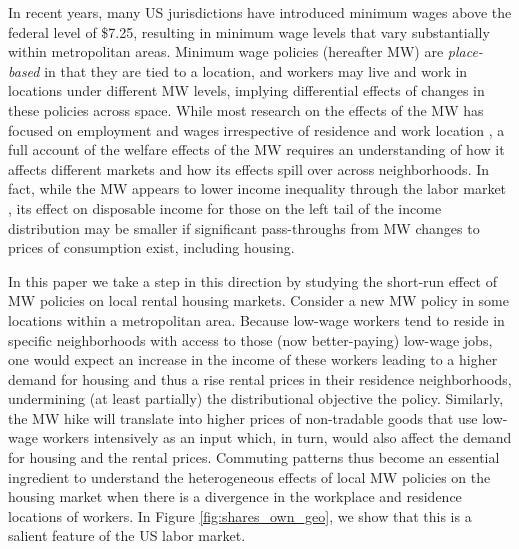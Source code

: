 

In recent years, many US jurisdictions have introduced minimum wages above the 
federal level of \$7.25, resulting in minimum wage levels that vary 
substantially within metropolitan areas.
Minimum wage policies (hereafter MW) are \textit{place-based} in that they are 
tied to a location, and workers may live and work in locations under different 
MW levels, 
implying differential effects of changes in these policies across space.
While most research on the effects of the MW has focused on employment and 
wages irrespective of residence and work location
\parencite[e.g.,][]{CardKrueger1994, CegnizEtAl2019},
a full account of the welfare effects of the MW requires an understanding of 
how it affects different markets and how its effects spill over across 
neighborhoods.
In fact, while the MW appears to lower income inequality through the labor 
market \parencite{Lee1999, AutorEtAl2016},
its effect on disposable income for those on the left tail of the income 
distribution may be smaller if significant pass-throughs from MW changes to 
prices of consumption exist, including housing.

In this paper we take a step in this direction by studying the short-run effect 
of MW policies on local rental housing markets.
Consider a new MW policy in some locations within a metropolitan area.
Because low-wage workers tend to reside in specific neighborhoods with access 
to those (now better-paying) low-wage jobs,
one would expect an increase in the income of these workers leading to a higher 
demand for housing and thus a rise rental prices in their residence 
neighborhoods,
undermining (at least partially) the distributional objective the policy.
Similarly, the MW hike will translate into higher prices of non-tradable goods 
that use low-wage workers intensively as an input which, in turn, 
would also affect the demand for housing and the rental prices.
Commuting patterns thus become an essential ingredient to understand the 
heterogeneous effects of local MW policies on the housing market when there 
is a divergence in the workplace and residence locations of workers.
In Figure \ref{fig:shares_own_geo}, we show that this is a salient feature of 
the US labor market.

